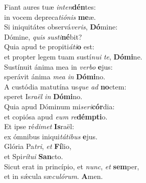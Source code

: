\evenverse Fiant aures tuæ \textit{in}\textit{ten}\textbf{dén}tes:~\*\\
\evenverse in vocem depreca\textit{ti}\textit{ó}\textit{nis} \textbf{me}æ.\\
\oddverse Si iniquitátes observá\textit{ve}\textit{ris}, \textbf{Dó}mine:~\*\\
\oddverse Dómine, \textit{quis} \textit{su}\textit{sti}\textbf{né}bit?\\
\evenverse Quia apud te propiti\textit{á}\textit{ti}\textbf{o} est:~\*\\
\evenverse et propter legem tuam sustí\textit{nu}\textit{i} \textit{te}, \textbf{Dó}\textbf{mi}ne.\\
\oddverse Sustínuit ánima mea in \textit{ver}\textit{bo} \textbf{e}jus:~\*\\
\oddverse sperávit ánima \textit{me}\textit{a} \textit{in} \textbf{Dó}\textbf{mi}no.\\
\evenverse A custódia matutína us\textit{que} \textit{ad} \textbf{no}ctem:~\*\\
\evenverse speret Is\textit{ra}\textit{ël} \textit{in} \textbf{Dó}\textbf{mi}no.\\
\oddverse Quia apud Dóminum mi\textit{se}\textit{ri}\textbf{cór}dia:~\*\\
\oddverse et copiósa apud \textit{e}\textit{um} \textit{re}\textbf{dém}\textbf{pti}o.\\
\evenverse Et ipse ré\textit{di}\textit{met} \textbf{Is}raël:~\*\\
\evenverse ex ómnibus iniqui\textit{tá}\textit{ti}\textit{bus} \textbf{e}jus.\\
\oddverse Glória Pa\textit{tri}, \textit{et} \textbf{Fí}lio,~\*\\
\oddverse et Spi\textit{rí}\textit{tu}\textit{i} \textbf{San}cto.\\
\evenverse Sicut erat in princípio, et \textit{nunc}, \textit{et} \textbf{sem}per,~\*\\
\evenverse et in sǽcula sæ\textit{cu}\textit{ló}\textit{rum}. \textbf{A}men.\\
